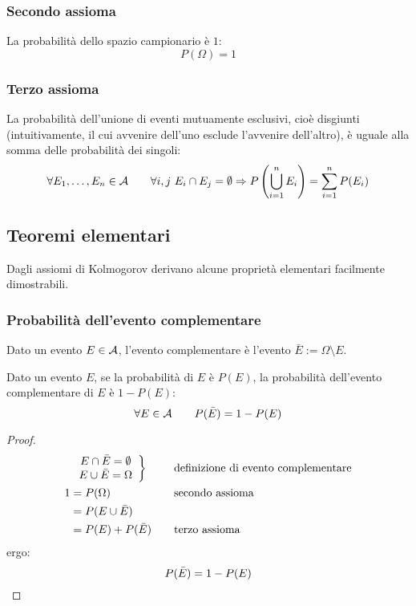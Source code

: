 \subsubsection{Secondo assioma}
La probabilità dello spazio campionario è $1$:
\begin{equation*}
	P(\Omega)=1
\end{equation*}


\subsubsection{Terzo assioma}
La probabilità dell'unione di eventi mutuamente esclusivi, cioè disgiunti (intuitivamente, il cui avvenire dell'uno esclude l'avvenire dell'altro), è uguale alla somma delle probabilità dei singoli:
\begin{equation*}
	\forall E_1,\dots,E_n\in\mathcal A\qquad \forall i,j~E_i\cap E_j = \emptyset \Rightarrow P\left( \bigcup_{i=1}^n E_i \right)=\sum_{i=1}^n P(E_i)
\end{equation*}



\subsection{Teoremi elementari}
Dagli assiomi di Kolmogorov derivano alcune proprietà elementari facilmente dimostrabili.


\subsubsection{Probabilità dell'evento complementare}
\begin{defin}
	Dato un evento $E\in\mathcal A$, l'evento complementare è l'evento $\bar E := \Omega\setminus E$.
\end{defin}
\begin{teor} \label{t:probcompl}
	Dato un evento $E$, se la probabilità di $E$ è $P(E)$, la probabilità dell'evento complementare di $E$ è $1-P(E)$:
	\begin{equation*}
		\forall E\in\mathcal A\qquad P(\bar E)=1-P(E)
	\end{equation*}
\end{teor}
\begin{proof}
	\begin{align*}
		  & \left.
		\begin{array}{cc}
			E\cap\bar E=\emptyset \\
			E\cup\bar E=\Omega
		\end{array} \right\}  & \quad & \text{definizione di evento complementare} \\
		1 & = P(\Omega)        & \quad & \text{secondo assioma}                                  \\
		  & = P(E\cup\bar E)                                                         \\
		  & = P(E)+P(\bar E)   & \quad & \text{terzo assioma}
	\end{align*}
	ergo:
	\begin{equation*}
		P(\bar E)=1-P(E) \qedhere
	\end{equation*}
\end{proof}


